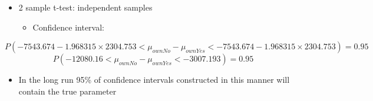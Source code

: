 \documentclass[
  ignorenonframetext,
]{beamer}
\providecommand{\tightlist}{%
  \setlength{\itemsep}{0pt}\setlength{\parskip}{0pt}}\usepackage{longtable,booktabs,array}
\begin{document}
\begin{frame}{}
\label{section-20}
\begin{itemize}
\item
  2 sample t-test: independent samples

  \begin{itemize}
  \tightlist
  \item
    Confidence interval:
  \end{itemize}
\end{itemize}

\tiny

\[P(-7543.674 - 1.968315\times2304.753 < \mu_{ownNo} - \mu_{ownYes} < -7543.674 - 1.968315\times2304.753) = 0.95\]
\[P(-12080.16 < \mu_{ownNo} - \mu_{ownYes} < -3007.193) = 0.95\]

\normalsize

\begin{itemize}
\tightlist
\item
  In the long run 95\% of confidence intervals constructed in this
  manner will contain the true parameter
\end{itemize}
\end{frame}
\end{document}
